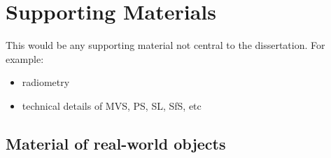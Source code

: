 \chapter{Supporting Materials}

This would be any supporting material not central to the dissertation.
For example:
\begin{itemize}
\item radiometry
\item technical details of MVS, PS, SL, SfS, etc
\end{itemize}

\section{Material of real-world objects}
